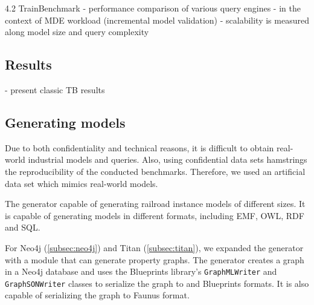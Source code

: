 4.2 TrainBenchmark
  - performance comparison of various query engines
  - in the context of MDE workload (incremental model validation)
  - scalability is measured along model size and query complexity

\subsection{Results}
  
  - present classic TB results


\subsection{Generating models}

Due to both confidentiality and technical reasons, it is difficult to obtain real-world industrial models and queries. Also, using confidential data sets hamstrings the reproducibility of the conducted benchmarks. Therefore, we used an artificial data set which mimics real-world models.

The generator capable of generating railroad instance models of different sizes. It is capable of generating models in different formats, including EMF, OWL, RDF and SQL. 

For Neo4j (\autoref{subsec:neo4j}) and Titan (\autoref{subsec:titan}), we expanded the generator with a module that can generate property graphs. The generator creates a graph in a Neo4j database and uses the Blueprints library's \texttt{GraphMLWriter} and \texttt{GraphSONWriter} classes to serialize the graph to \graphml{} and Blueprints \graphson{} formats. It is also capable of serializing the graph to Faunus \graphson{} format.
